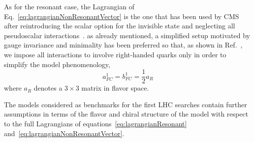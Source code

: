 
As for the resonant case, the Lagrangian of Eq.~\eqref{eq:lagrangianNonResonantVector} is the one that
has been used by CMS after reintroducing the scalar option for the invisible
state and neglecting all pseudoscalar interactions~\cite{CMSmonotop}. as
already mentioned, a simplified setup motivated by gauge invariance and
minimality has been preferred so that, as shown in Ref.~\cite{Boucheneb:2014wza}, we
impose all interactions to involve right-handed quarks only in order to simplify the model phenomenology,
\begin{equation}
a^1_{FC} = b^1_{FC} = \frac12 a_R
\end{equation}
where $a_R$ denotes a $3\times 3$ matrix in flavor space.

 
The models considered as benchmarks for the first LHC searches
contain further assumptions in terms of the flavor and chiral structure of the model
with respect to the full Lagrangians of equations~\eqref{eq:lagrangianResonant} and~\eqref{eq:lagrangianNonResonantVector}.


